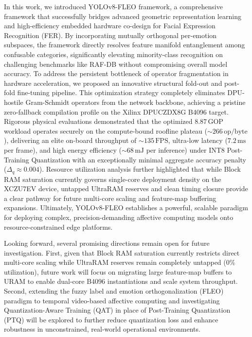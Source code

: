 \documentclass[algorithms,article,submit,moreauthors]{Definitions/mdpi}
\begin{document}
In this work, we introduced YOLOv8-FLEO framework, a comprehensive framework that successfully bridges advanced geometric representation learning and high-efficiency embedded hardware co-design for Facial Expression Recognition (FER). By incorporating mutually orthogonal per-emotion subspaces, the framework directly resolves feature manifold entanglement among confusable categories, significantly elevating minority-class recognition on challenging benchmarks like RAF-DB without compromising overall model accuracy. To address the persistent bottleneck of operator fragmentation in hardware acceleration, we proposed an innovative structural fold-out and post-fold fine-tuning pipeline. This optimization strategy completely eliminates DPU-hostile Gram-Schmidt operators from the network backbone, achieving a pristine zero-fallback compilation profile on the Xilinx DPUCZDX8G B4096 target. Rigorous physical evaluations demonstrated that the optimized $8.87\,\text{GOP}$ workload operates securely on the compute-bound roofline plateau ($\sim 266\,\text{op/byte}$), delivering an elite on-board throughput of $\sim 135\,\text{FPS}$, ultra-low latency ($7.2\,\text{ms}$ per frame), and high energy efficiency ($\sim 68\,\text{mJ}$ per inference) under INT8 Post-Training Quantization with an exceptionally minimal aggregate accuracy penalty ($\Delta_q \approx 0.004$). Resource utilization analysis further highlighted that while Block RAM saturation currently governs single-core deployment density on the XCZU7EV device, untapped UltraRAM reserves and clean timing closure provide a clear pathway for future multi-core scaling and feature-map buffering expansions. Ultimately, YOLOv8-FLEO establishes a powerful, scalable paradigm for deploying complex, precision-demanding affective computing models onto resource-constrained edge platforms.

Looking forward, several promising directions remain open for future investigation. First, given that Block RAM saturation currently restricts direct multi-core scaling while UltraRAM reserves remain completely untapped ($0\%$ utilization), future work will focus on migrating large feature-map buffers to URAM to enable dual-core B4096 instantiations and scale system throughput. Second, extending the fuzzy label and emotion orthogonalization (FLEO) paradigm to temporal video-based affective computing and investigating Quantization-Aware Training (QAT) in place of Post-Training Quantization (PTQ) will be explored to further reduce quantization loss and enhance robustness in unconstrained, real-world operational environments.
\end{document}
